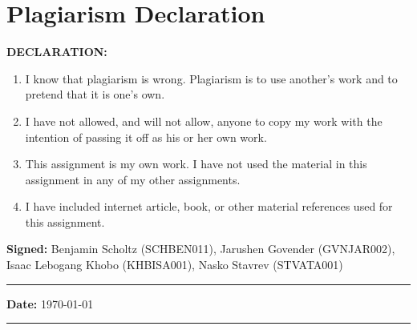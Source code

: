 
\newpage
\section{Plagiarism Declaration}
\textbf{DECLARATION:}
\begin{enumerate}
\item I know that plagiarism is wrong. Plagiarism is to use another’s work and to pretend that it is one’s own.
\item I have not allowed, and will not allow, anyone to copy my work with the intention of passing it off as his or her own work.
\item This assignment is my own work. I have not used the material in this assignment in any of my other assignments.
\item I have included internet article, book, or other material references used for this assignment.
\end{enumerate}

\textbf{Signed:} Benjamin Scholtz (SCHBEN011),
Jarushen Govender (GVNJAR002),\\
Isaac Lebogang Khobo (KHBISA001),
Nasko Stavrev (STVATA001)\\
\hrule
\textbf{Date:} \today \\
\hrule